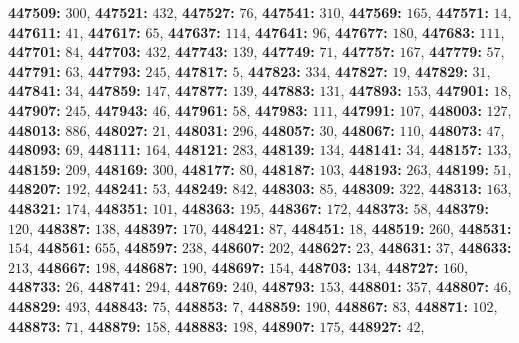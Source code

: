 \textsf{\bfseries 447509:} $300$, \textsf{\bfseries 447521:} $432$, \textsf{\bfseries 447527:} $76$, \textsf{\bfseries 447541:} $310$, \textsf{\bfseries 447569:} $165$, \textsf{\bfseries 447571:} $14$, \textsf{\bfseries 447611:} $41$, \textsf{\bfseries 447617:} $65$, \textsf{\bfseries 447637:} $114$, \textsf{\bfseries 447641:} $96$, \textsf{\bfseries 447677:} $180$, \textsf{\bfseries 447683:} $111$, \textsf{\bfseries 447701:} $84$, \textsf{\bfseries 447703:} $432$, \textsf{\bfseries 447743:} $139$, \textsf{\bfseries 447749:} $71$, \textsf{\bfseries 447757:} $167$, \textsf{\bfseries 447779:} $57$, \textsf{\bfseries 447791:} $63$, \textsf{\bfseries 447793:} $245$, \textsf{\bfseries 447817:} $5$, \textsf{\bfseries 447823:} $334$, \textsf{\bfseries 447827:} $19$, \textsf{\bfseries 447829:} $31$, \textsf{\bfseries 447841:} $34$, \textsf{\bfseries 447859:} $147$, \textsf{\bfseries 447877:} $139$, \textsf{\bfseries 447883:} $131$, \textsf{\bfseries 447893:} $153$, \textsf{\bfseries 447901:} $18$, \textsf{\bfseries 447907:} $245$, \textsf{\bfseries 447943:} $46$, \textsf{\bfseries 447961:} $58$, \textsf{\bfseries 447983:} $111$, \textsf{\bfseries 447991:} $107$, \textsf{\bfseries 448003:} $127$, \textsf{\bfseries 448013:} $886$, \textsf{\bfseries 448027:} $21$, \textsf{\bfseries 448031:} $296$, \textsf{\bfseries 448057:} $30$, \textsf{\bfseries 448067:} $110$, \textsf{\bfseries 448073:} $47$, \textsf{\bfseries 448093:} $69$, \textsf{\bfseries 448111:} $164$, \textsf{\bfseries 448121:} $283$, \textsf{\bfseries 448139:} $134$, \textsf{\bfseries 448141:} $34$, \textsf{\bfseries 448157:} $133$, \textsf{\bfseries 448159:} $209$, \textsf{\bfseries 448169:} $300$, \textsf{\bfseries 448177:} $80$, \textsf{\bfseries 448187:} $103$, \textsf{\bfseries 448193:} $263$, \textsf{\bfseries 448199:} $51$, \textsf{\bfseries 448207:} $192$, \textsf{\bfseries 448241:} $53$, \textsf{\bfseries 448249:} $842$, \textsf{\bfseries 448303:} $85$, \textsf{\bfseries 448309:} $322$, \textsf{\bfseries 448313:} $163$, \textsf{\bfseries 448321:} $174$, \textsf{\bfseries 448351:} $101$, \textsf{\bfseries 448363:} $195$, \textsf{\bfseries 448367:} $172$, \textsf{\bfseries 448373:} $58$, \textsf{\bfseries 448379:} $120$, \textsf{\bfseries 448387:} $138$, \textsf{\bfseries 448397:} $170$, \textsf{\bfseries 448421:} $87$, \textsf{\bfseries 448451:} $18$, \textsf{\bfseries 448519:} $260$, \textsf{\bfseries 448531:} $154$, \textsf{\bfseries 448561:} $655$, \textsf{\bfseries 448597:} $238$, \textsf{\bfseries 448607:} $202$, \textsf{\bfseries 448627:} $23$, \textsf{\bfseries 448631:} $37$, \textsf{\bfseries 448633:} $213$, \textsf{\bfseries 448667:} $198$, \textsf{\bfseries 448687:} $190$, \textsf{\bfseries 448697:} $154$, \textsf{\bfseries 448703:} $134$, \textsf{\bfseries 448727:} $160$, \textsf{\bfseries 448733:} $26$, \textsf{\bfseries 448741:} $294$, \textsf{\bfseries 448769:} $240$, \textsf{\bfseries 448793:} $153$, \textsf{\bfseries 448801:} $357$, \textsf{\bfseries 448807:} $46$, \textsf{\bfseries 448829:} $493$, \textsf{\bfseries 448843:} $75$, \textsf{\bfseries 448853:} $7$, \textsf{\bfseries 448859:} $190$, \textsf{\bfseries 448867:} $83$, \textsf{\bfseries 448871:} $102$, \textsf{\bfseries 448873:} $71$, \textsf{\bfseries 448879:} $158$, \textsf{\bfseries 448883:} $198$, \textsf{\bfseries 448907:} $175$, \textsf{\bfseries 448927:} $42$, 
